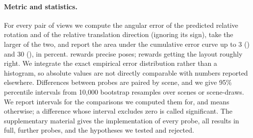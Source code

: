 \paragraph{Metric and statistics.}
For every pair of views we compute the angular error of the predicted relative rotation and of the relative translation direction (ignoring its sign), take the larger of the two, and report the area under the cumulative error curve up to 3\textdegree{} (\auc) and 30\textdegree{} (\aucc), in percent. \auc rewards precise poses; \aucc rewards getting the layout roughly right. We integrate the exact empirical error distribution rather than a histogram, so absolute values are not directly comparable with numbers reported elsewhere. Differences between probes are paired by scene, and we give 95\% percentile intervals from 10{,}000 bootstrap resamples over scenes or scene-draws. We report intervals for the comparisons we computed them for, and means otherwise; a difference whose interval excludes zero is called significant. The supplementary material gives the implementation of every probe, all results in full, further probes, and the hypotheses we tested and rejected.
